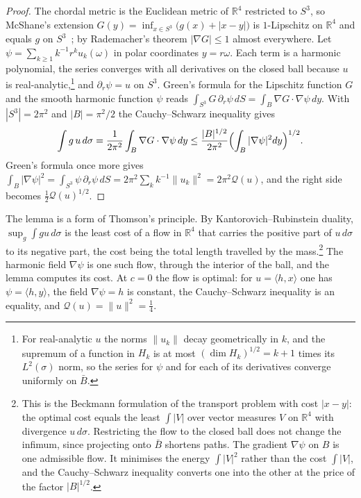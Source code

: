 \documentclass[aps,prd,twocolumn,superscriptaddress,nofootinbib,longbibliography,floatfix,amsmath,amssymb,10pt]{revtex4-2}
\theoremstyle{definition}
\theoremstyle{remark}
\newcommand{\R}{\mathbb{R}}
\newcommand{\ip}[2]{\langle #1,#2\rangle}
\begin{document}
\begin{proof}
The chordal metric is the Euclidean metric of $\R^4$ restricted to $S^3$,
so McShane's extension $G(y)=\inf_{x\in S^3}\bigl(g(x)+|x-y|\bigr)$
is $1$-Lipschitz on $\R^4$ and equals $g$ on $S^3$~\cite{McS34}; by
Rademacher's theorem $|\nabla G|\le1$ almost everywhere. Let
$\psi=\sum_{k\ge1}k^{-1}r^ku_k(\omega)$ in polar coordinates $y=r\omega$. Each
term is a harmonic polynomial, the series converges with all derivatives on
the closed ball because $u$ is real-analytic,\footnote{For real-analytic
$u$ the norms $\|u_k\|$ decay geometrically in $k$, and the supremum of a
function in $H_k$ is at most $(\dim H_k)^{1/2}=k+1$ times its $L^2(\sigma)$
norm, so the series for $\psi$ and for each of its derivatives converge
uniformly on $\bar B$.} and $\partial_r\psi=u$ on $S^3$. Green's formula for
the Lipschitz function $G$ and the smooth harmonic function $\psi$ reads
$\int_{S^3}G\,\partial_r\psi\,dS=\int_B\nabla G\cdot\nabla\psi\,dy$. With
$|S^3|=2\pi^2$ and $|B|=\pi^2/2$ the Cauchy--Schwarz inequality gives
\[
\int g\,u\,d\sigma=\frac1{2\pi^2}\int_B\nabla G\cdot\nabla\psi\,dy\le
\frac{|B|^{1/2}}{2\pi^2}\Bigl(\int_B|\nabla\psi|^2dy\Bigr)^{1/2}.
\]
Green's formula once more gives $\int_B|\nabla\psi|^2=\int_{S^3}\psi\,
\partial_r\psi\,dS=2\pi^2\sum_kk^{-1}\|u_k\|^2=2\pi^2\mathcal Q(u)$, and the
right side becomes $\frac12\mathcal Q(u)^{1/2}$.
\end{proof}

The lemma is a form of Thomson's principle. By Kantorovich--Rubinstein
duality, $\sup_g\int gu\,d\sigma$ is the least cost of a flow in $\R^4$ that
carries the positive part of $u\,d\sigma$ to its negative part, the cost
being the total length travelled by the mass.\footnote{This is the
Beckmann formulation of the transport problem with cost $|x-y|$: the
optimal cost equals the least $\int|V|$ over vector measures $V$ on $\R^4$
with divergence $u\,d\sigma$. Restricting the flow to the closed ball does
not change the infimum, since projecting onto $\bar B$ shortens paths. The
gradient $\nabla\psi$ on $B$ is one admissible flow. It minimises the energy
$\int|V|^2$ rather than the cost $\int|V|$, and the Cauchy--Schwarz inequality
converts one into the other at the price of the factor $|B|^{1/2}$.} The
harmonic field $\nabla\psi$ is one such flow, through the interior of the
ball, and the lemma computes its cost. At $c=0$ the flow is optimal: for
$u=\ip hx$ one has $\psi=\ip hy$, the field $\nabla\psi=h$ is constant,
the Cauchy--Schwarz inequality is an equality, and $\mathcal Q(u)=\|u\|^2=
\frac14$.
\end{document}
